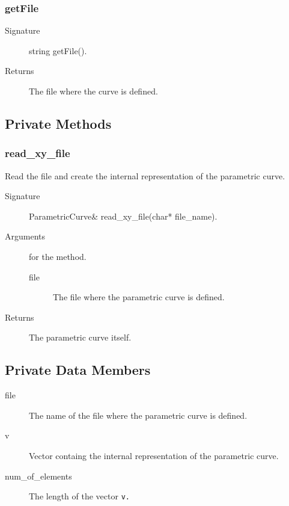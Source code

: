 \subsubsection{getFile}
\begin{description}
    \item [Signature] string  getFile().
    \item [Returns] The file where the curve is defined.
\end{description}

\subsection{Private Methods}

\subsubsection{read\_xy\_file}
Read the file and create the internal representation of the parametric curve.
 \begin{description}
     \item [Signature] ParametricCurve\& read\_xy\_file(char*
 file\_name).
    \item [Arguments] for the method.
      \begin{description}
        \item [file] The file where the parametric curve is defined.
       \end{description}
    \item [Returns] The parametric curve itself.
 \end{description} 

\subsection{Private Data Members}
\begin{description}
 \item [file] The name of the file where the parametric curve
                      is defined.
 \item [v] Vector containg the internal representation of the
                          parametric curve. 
 \item [num\_of\_elements]  The length of the vector \tt v\rm.
\end{description}
